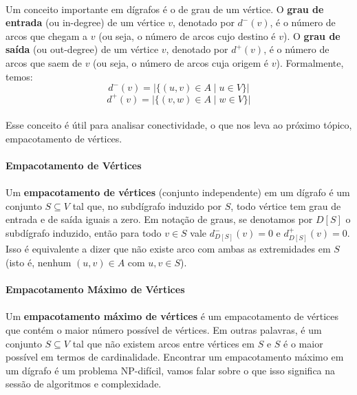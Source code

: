 \documentclass[12pt,a4paper]{article}
\def\emph#1{#1}%
\begin{document}
\paragraph{}
Um conceito importante em dígrafos é o de grau de um vértice. O \textbf{grau de entrada} (ou \emph{in-degree}) de um vértice \(v\), denotado por \(d^-(v)\), é o número de arcos que chegam a \(v\) (ou seja, o número de arcos cujo destino é \(v\)). O \textbf{grau de saída} (ou \emph{out-degree}) de um vértice \(v\), denotado por \(d^+(v)\), é o número de arcos que saem de \(v\) (ou seja, o número de arcos cuja origem é \(v\)). Formalmente, temos:
\[d^-(v) = |\{(u, v) \in A \mid u \in V\}|\]
\[d^+(v) = |\{(v, w) \in A \mid w \in V\}|\]

\paragraph{}
Esse conceito é útil para analisar conectividade, o que nos leva ao próximo tópico, empacotamento de vértices.

\paragraph{Empacotamento de Vértices}
\paragraph{}Um \textbf{empacotamento de vértices} (conjunto independente) em um dígrafo é um conjunto \(S\subseteq V\) tal que, no subdígrafo induzido por \(S\), todo vértice tem grau de entrada e de saída iguais a zero. Em notação de graus, se denotamos por \(D[S]\) o subdígrafo induzido, então para todo \(v\in S\) vale \(d^-_{D[S]}(v)=0\) e \(d^+_{D[S]}(v)=0\). Isso é equivalente a dizer que não existe arco com ambas as extremidades em \(S\) (isto é, nenhum \((u,v)\in A\) com \(u,v\in S\)).

\paragraph{Empacotamento Máximo de Vértices}
\paragraph{}
Um \textbf{empacotamento máximo de vértices} é um empacotamento de vértices que contém o maior número possível de vértices. Em outras palavras, é um conjunto \(S\subseteq V\) tal que não existem arcos entre vértices em \(S\) e \(S\) é o maior possível em termos de cardinalidade. Encontrar um empacotamento máximo em um dígrafo é um problema NP-difícil, vamos falar sobre o que isso significa na sessão de algoritmos e complexidade.
\end{document}

